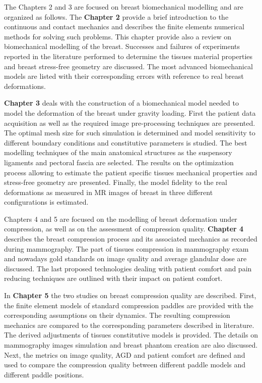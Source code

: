 The Chapters 2 and 3 are focused on breast biomechanical modelling and are organized as follows. The \textbf{Chapter 2} provide a brief introduction to the continuous and contact mechanics and describes the finite elements numerical methods for solving such problems.  This chapter provide also a review on biomechanical modelling of the breast. Successes and failures of experiments reported in the literature performed to determine the tissues material properties and breast stress-free geometry are discussed. The most advanced biomechanical models are listed with their corresponding errors with reference to real breast deformations. 

\textbf{Chapter 3} deals with the construction of a biomechanical model needed to model the
deformation of the breast under gravity loading. First the patient data acquisition as well as the required image pre-processing techniques are presented. The optimal mesh size for such simulation is determined and model sensitivity to different boundary conditions and constitutive parameters is studied. The best modelling techniques of the main anatomical structures as the suspensory ligaments and pectoral fascia are selected. The results on the optimization process allowing to estimate the patient specific tissues mechanical properties and stress-free geometry are presented.
Finally, the model fidelity to the real deformations as measured in MR images of breast in three different configurations is estimated.

Chapters 4 and 5 are focused on the modelling of breast deformation under compression, as well as on the assessment of compression quality.  \textbf{Chapter 4} describes the breast compression process and its associated mechanics as recorded during mammography. The part of tissues compression in mammography exam and nowadays gold standards on image quality and average glandular dose are discussed. The last proposed technologies dealing with patient comfort and pain reducing techniques are outlined with their impact on patient comfort.      

In \textbf{Chapter 5} the two studies on breast compression quality are described. First, the finite element models of standard compression paddles are provided with the corresponding assumptions on their dynamics. The resulting compression mechanics are compared to the corresponding parameters described in literature. The derived adjustments of tissues constitutive models is provided. The details on mammography images simulation and breast phantom creation are also discussed. Next, the metrics on image quality, AGD and patient comfort are defined and used to compare the compression quality between different paddle models and different paddle positions. 
 

